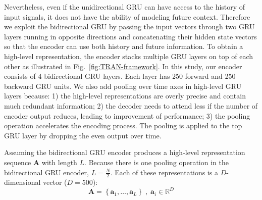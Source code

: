 \documentclass[a4paper,conference]{IEEEtran}
\begin{document}
Nevertheless, even if the unidirectional GRU can have access to the history of input signals, it does not have the ability of modeling future context. Therefore we exploit the bidirectional GRU by passing the input vectors through two GRU layers running in opposite directions and concatenating their hidden state vectors so that the encoder can use both history and future information. To obtain a high-level representation, the encoder stacks multiple GRU layers on top of each other as illustrated in Fig.~\ref{fig:TRAN-framework}. In this study, our encoder consists of 4 bidirectional GRU layers. Each layer has 250 forward and 250 backward GRU units. We also add pooling over time axes in high-level GRU layers because: 1) the high-level representations are overly precise and contain much redundant information; 2) the decoder needs to attend less if the number of encoder output reduces, leading to improvement of performance; 3) the pooling operation accelerates the encoding process. The pooling is applied to the top GRU layer by dropping the even output over time.

Assuming the bidirectional GRU encoder produces a high-level representation sequence ${\mathbf{A}}$ with length ${L}$. Because there is one pooling operation in the bidirectional GRU encoder, $L = \frac{N}{2}$. Each of these representations is a $D$-dimensional vector ($D=500$):
\begin{equation}\label{eq:annotation A}
  \mathbf{A} = \left\{ {{{\mathbf{a}}_1}, \ldots ,{{\mathbf{a}}_L}} \right\}\;,\;{{\mathbf{a}}_i} \in {\mathbb{R}^D}
\end{equation}
\end{document}
